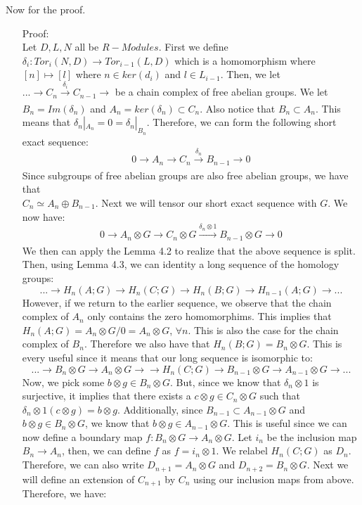 \documentclass[11pt]{article}
\theoremstyle{definition}
\begin{document}
Now for the proof.
\begin{enumerate}
    \item [Proof:]\text{ }\\
    Let $D,L,N$ all be $R-Modules$. First we define $\delta_i:Tor_i(N,D)\rightarrow Tor_{i-1}(L,D)$ which is a homomorphism where $[n]\mapsto[l]$ where $n\in ker(d_i)$ and $l\in L_{i-1}$. 
    Then, we let $...\rightarrow C_n\xrightarrow[]{\delta_i}C_{n-1}\rightarrow$ be a chain complex of free abelian groups. We let $B_n=Im(\delta_n)$ and $A_n=ker(\delta_n)\subset C_n$. Also notice that $B_n\subset A_n$. 
    This means that $\delta_n|_{A_n}=0=\delta_n|_{B_n}$. Therefore, we can form the following short exact sequence: 
    $$0\rightarrow A_n\rightarrow C_n\xrightarrow[]{\delta_n} B_{n-1} \rightarrow 0$$
    Since subgroups of free abelian groups are also free abelian groups, we have that \\$C_n\simeq A_n\oplus B_{n-1}$. Next we will tensor our short exact sequence with $G$. We now have: 
    $$0\rightarrow A_n\otimes G\rightarrow C_n\otimes G\xrightarrow[]{\delta_n\otimes 1} B_{n-1}\otimes G \rightarrow 0$$
    We then can apply the Lemma 4.2 to realize that the above sequence is split. Then, using Lemma 4.3, we can identity a long sequence of the homology groups: 
    $$...\rightarrow H_{n}(A;G)\rightarrow H_{n}(C;G)\rightarrow H_{n}(B;G)\rightarrow H_{n-1}(A;G)\rightarrow...$$ 
    However, if we return to the earlier sequence, we observe that the chain complex of $A_n$ only contains the zero homomorphims. This implies that $H_n(A;G)=A_n\otimes G/0=A_n\otimes G$, $\forall n$. This is also the case for the chain complex of $B_n$. Therefore we also have that $H_n(B;G)=B_n\otimes G$. This is every useful since it means that our long sequence is isomorphic to:
    $$...\rightarrow B_n\otimes G\rightarrow A_n\otimes G \rightarrow\rightarrow H_n(C;G)\rightarrow B_{n-1}\otimes G\rightarrow A_{n-1}\otimes G \rightarrow ...$$
    Now, we pick some $b\otimes g\in B_n\otimes G$. But, since we know that $\delta_n \otimes 1$ is surjective, it implies that there exists a $c\otimes g\in C_n\otimes G$ such that $\delta_n\otimes 1(c\otimes g)=b\otimes g$. 
    Additionally, since $B_{n-1}\subset A_{n-1}\otimes G$ and $b\otimes g\in B_n\otimes G$, we know that $b\otimes g\in A_{n-1}\otimes G$. 
    This is useful since we can now define a boundary map $f:B_n\otimes G\rightarrow A_n\otimes G$. 
    Let $i_n$ be the inclusion map $B_n\rightarrow A_n$, then, we can define $f$ as $f=i_n\otimes 1$.
    We relabel $H_n(C;G)$ as $D_n$. Therefore, we can also write $D_{n+1}=A_n\otimes G$ and $D_{n+2}=B_n\otimes G$. Next we will define an extension of $C_{n+1}$ by $C_{n}$ using our inclusion maps from above. Therefore, we have: 

\end{enumerate}
\end{document}
